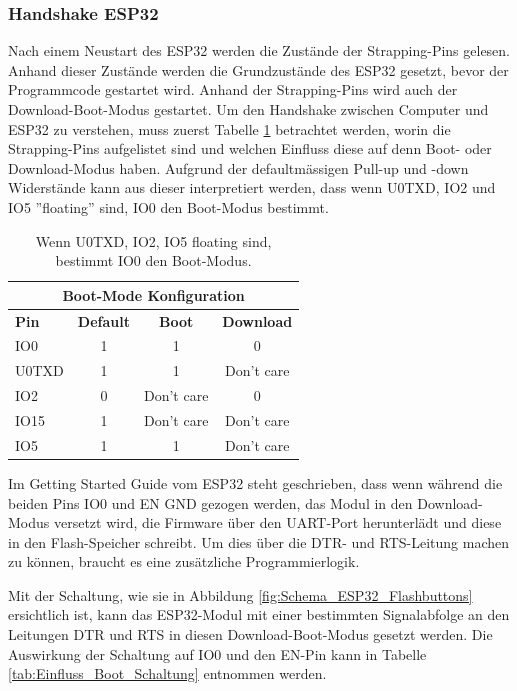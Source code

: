 \subsubsection{Handshake ESP32}\label{subsubsec:Handshake_ESP32}
Nach einem Neustart des ESP32 werden die Zustände der Strapping-Pins gelesen. Anhand dieser Zustände werden die Grundzustände des ESP32 gesetzt, bevor der Programmcode gestartet wird. Anhand der Strapping-Pins wird auch der Download-Boot-Modus gestartet.
Um den Handshake zwischen Computer und ESP32 zu verstehen, muss zuerst Tabelle \ref{tab:Einfluss_Pins_auf_Boot_Modus} betrachtet werden, worin die Strapping-Pins aufgelistet sind und welchen Einfluss diese auf denn Boot- oder Download-Modus haben. Aufgrund der defaultmässigen Pull-up und -down Widerstände kann aus dieser interpretiert werden, dass wenn U0TXD, IO2 und IO5 ''floating'' sind, IO0 den Boot-Modus bestimmt.

\begin{table}[h!]
\center
\begin{tabular}{|l|c|c|c|}
\hline
\multicolumn{4}{|c|}{\textbf{Boot-Mode Konfiguration}}\\
\hline
\textbf{Pin} & \textbf{Default} & \textbf{Boot} & \textbf{Download} \\
\hline
IO0 & 1 & 1 & 0 \\
\hline
U0TXD & 1 & 1 & Don't care \\
\hline
IO2 & 0 & Don't care & 0 \\
\hline
IO15 & 1 & Don't care & Don't care \\
\hline
IO5 & 1 & 1 & Don't care \\
\hline
\end{tabular}
\caption{Wenn U0TXD, IO2, IO5 floating sind, bestimmt IO0 den Boot-Modus.}
\label{tab:Einfluss_Pins_auf_Boot_Modus}
\end{table}

Im Getting Started Guide vom ESP32 steht geschrieben, dass wenn während die beiden Pins IO0 und EN GND gezogen werden, das Modul in den Download-Modus versetzt wird, die Firmware über den UART-Port herunterlädt und diese in den Flash-Speicher schreibt. Um dies über die DTR- und RTS-Leitung machen zu können, braucht es eine zusätzliche Programmierlogik.

Mit der Schaltung, wie sie in Abbildung \ref{fig:Schema_ESP32_Flashbuttons} ersichtlich ist, kann das ESP32-Modul mit einer bestimmten Signalabfolge an den Leitungen DTR und RTS in diesen Download-Boot-Modus gesetzt werden. Die Auswirkung der Schaltung auf IO0 und den EN-Pin kann in Tabelle \ref{tab:Einfluss_Boot_Schaltung} entnommen werden.

